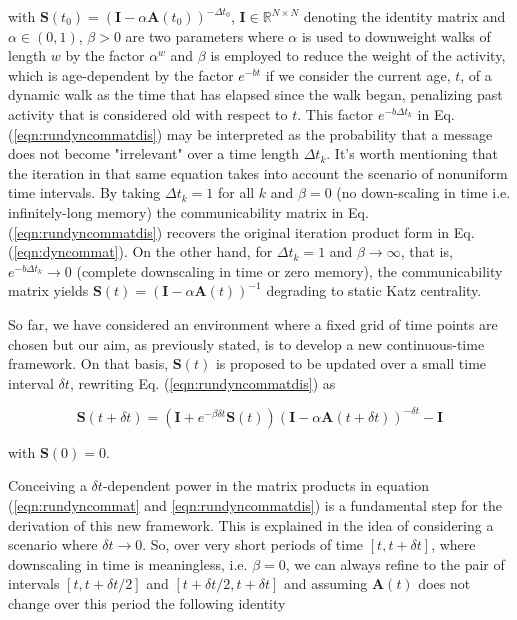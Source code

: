  with $\mathbf{S}(t_0) = (\mathbf{I} - \alpha \mathbf{A}(t_0))^{-\Delta t_0}$, $\mathbf{I}\in \mathbb{R}^{N\times N}$ denoting the identity matrix and $\alpha \in (0,1)$, $\beta > 0$ are two parameters where $\alpha$ is used to downweight walks of length $w$ by the factor $\alpha^w$ and $\beta$ is employed to reduce the weight of the activity, which is age-dependent by the factor $e^{-bt}$ if we consider the current age, $t$, of a dynamic walk as the time that has elapsed since the walk began, penalizing past activity that is considered old with respect to $t$. This factor $e^{-b\Delta t_k}$ in Eq. (\ref{eqn:rundyncommatdis}) may be interpreted as the probability that a message does not become "irrelevant" over a time length $\Delta t_k$. It's worth mentioning that the iteration in that same equation takes into account the scenario of nonuniform time intervals. By taking $\Delta t_k = 1$ for all $k$ and $\beta = 0$ (no down-scaling in time i.e. infinitely-long memory) the communicability matrix in Eq. (\ref{eqn:rundyncommatdis}) recovers the original iteration product form in Eq. (\ref{eqn:dyncommat}). On the other hand, for $\Delta t_k = 1$ and $\beta \to \infty$, that is, $e^{-b\Delta t_k}\to 0$ (complete downscaling in time or zero memory), the communicability matrix yields $\mathbf{S}(t)=(\mathbf{I} - \alpha \mathbf{A}(t))^{-1}$ degrading to static Katz centrality.

 So far, we have considered an environment where a fixed grid of time points are chosen but our aim, as previously stated, is to develop a new continuous-time framework. On that basis, $\mathbf{S}(t)$ is proposed to be updated over a small time interval $\delta t$, rewriting Eq. (\ref{eqn:rundyncommatdis}) as
 
 \begin{equation}
\label{eqn:rundyncommat}
    \mathbf{S}(t + \delta t) = (\mathbf{I} + e^{-\beta\delta t}\mathbf{S}(t)) (\mathbf{I} - \alpha\mathbf{A}(t+\delta t))^{-\delta t} - \mathbf{I}
\end{equation} 

with $\mathbf{S}(0)=0$.

Conceiving a $\delta t$-dependent power in the matrix products in equation (\ref{eqn:rundyncommat} and \ref{eqn:rundyncommatdis}) is a fundamental step for the derivation of this new framework. This is explained in the idea of considering a scenario where $\delta t \to 0$. So, over very short periods of time $[t,t+\delta t]$, where downscaling in time is meaningless, i.e. $\beta = 0$, we can always refine to the pair of intervals $[t, t + \delta t/2]$ and $[t + \delta t/2, t + \delta t]$ and assuming $\mathbf{A}(t)$ does not change over this period the following identity 

